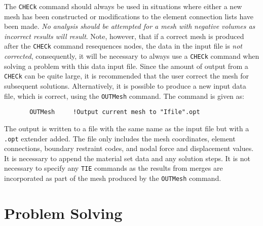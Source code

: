 The {\tt CHECk} command should always be used in situations where
either a new mesh
has been constructed or modifications to the element connection lists have
been made. {\it No analysis should be attempted for a mesh with}
{\it negative volumes as incorrect results will result}.  Note,
however, that if a correct mesh is produced after
the {\tt CHECk} command resequences nodes,
the data in the input file is {\it not corrected}, consequently, it
will be necessary to always use a {\tt CHECk} command when solving a
problem with this data input file.
Since the amount of output from a {\tt CHECk} can be quite large, it
is recommended that the user correct the mesh for subsequent
solutions.  Alternatively, it is possible to produce a new
input data file, which is correct, using the {\tt OUTMesh} command.
The command is given as:
\begin{verbatim}
       OUTMesh     !Output current mesh to "Ifile".opt
\end{verbatim}
The output is written to a file with the same name as the input file
but with a {\tt .opt} extender added. The file
only includes the mesh coordinates, element connections, boundary
restraint codes, and nodal force and displacement
values.  It is necessary to append the
material set data and any solution steps.  It is not necessary to specify
any {\tt TIE} commands as the results from merges are incorporated
as part of the mesh produced by the {\tt OUTMesh} command.

\section{Problem Solving}

